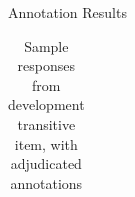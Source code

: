 \documentclass[final,14pt,t]{beamer}
\begin{document}
\begin{frame}{}
\begin{columns}[t]
\begin{column}{.33\linewidth}
\begin{minipage}[t][\textheight]{\linewidth}
\begin{block}{Annotation Results}
\begin{center}
\begin{minipage}{.85\textwidth}
\begin{table}[htb!]
\begin{center}
\begin{tabular}{|l||l|c|c|c|c|c|}
\hline
\end{tabular}
\caption{\label{tab:devo-transitive} Sample responses from development transitive item, with adjudicated annotations} %
\end{center}
\end{table}


\vspace{1em}


\end{minipage}
\end{center}
\end{block}
\end{minipage}
\end{column}
\end{columns}
\end{frame}
\end{document}
